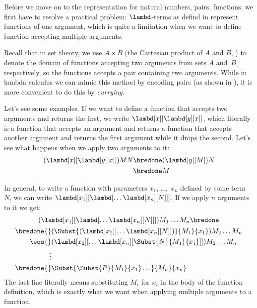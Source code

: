 \documentclass[../../../include/open-logic-section]{subfiles}
\begin{document}

Before we move on to the representation for natural numbers, pairs,
functions, we first have to resolve a practical problem:
$\lambd$-terms as defind in  represent functions
of one argument, which is quite a limitation when we want to define
function accepting multiple arguments.

Recall that in set theory, we use $A \times B$ (the Cartesian product
of $A$ and $B$, ) to denote the domain of
functions accepting two arguments from sets $A$ and~$B$ respectively,
so the functions accepts a pair containing two arguments. While in
lambda calculus we can mimic this method by encoding pairs (as shown
in ), it is more convenient to do this by
\emph{currying}.

Let's see some examples. If we want to define a function that accepts
two arguments and returns the first, we write
$\lambd[x][\lambd[y][x]]$, which literally is a function that accepts
an argument and returns a function that accepts another argument and
returns the first argument while it drops the second. Let's see what
happens when we apply two arguments to it:
\begin{align*}
  (\lambd[x][\lambd[y][x]])MN 
  \bredone & (\lambd[y][M])N \\
  \bredone & M
\end{align*}

In general, to write a function with parameters $x_1$, \dots,~$x_n$
defined by some term~$N$, we can write
$\lambd[x_1][\lambd[\ldots\lambd[x_n][N]]]$. If we apply $n$ arguments
to it we get:
\begin{multline*}
  (\lambd[x_1][\lambd[\ldots\lambd[x_n][N]]]) M_1 \dots M_n \bredone\\
  \begin{aligned}
  \bredone {} & (\Subst{(\lambd[x_2][\ldots\lambd[x_n][N]])}{M_1}{x_1}) M_2
  \dots M_n\\
   \eqs {} & (\lambd[x_2][\ldots\lambd[x_n][\Subst{N}{M_1}{x_1}]]) M_2
            \dots M_n \\
  \vdots & \\
  \bredone {} &\Subst{\Subst{P}{M_1}{x_1}\ldots}{M_n}{x_n}
  \end{aligned}
\end{multline*}
The last line literally means substituting $M_i$ for $x_i$ in the body
of the function definition, which is exactly what we want when
applying multiple arguments to a function.
\end{document}

